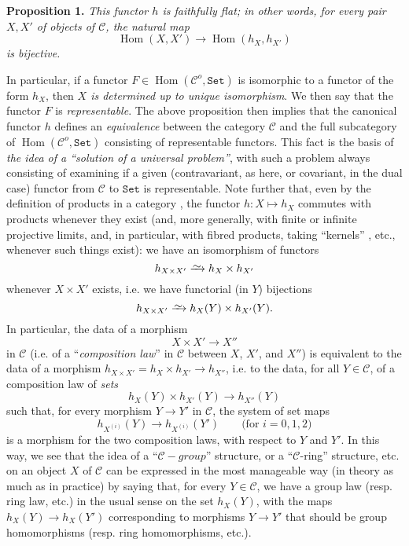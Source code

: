 \documentclass{article}
\newenvironment{itenv}[1]
  {\phantomsection\par\medskip\noindent\textbf{#1.}\itshape}
  {\medskip}
\renewcommand{\cal}[1]{{\mathcal{#1}}}
\newcommand{\simto}{\xrightarrow{\raisebox{-0.7ex}[0ex][0ex]{$\sim$}}}
\newcommand{\Set}{\mathtt{Set}}
\DeclareMathOperator{\Hom}{Hom}
\newcommand{\oldpage}[1]{\marginpar{\footnotesize$\Big\vert$ \textit{p.~#1}}}
\begin{document}
\begin{itenv}{Proposition 1}
\label{A.1-proposition1}
  This functor $h$ is \emph{faithfully flat};
  in other words, for every pair $X,X'$ of objects of $\cal{C}$, the natural map
  \[
    \Hom(X,X') \to \Hom(h_X,h_{X'})
  \]
  is \emph{bijective}.
\end{itenv}

In particular, if a functor $F\in\Hom(\cal{C}^o,\Set)$ is isomorphic to a functor of the form $h_X$, then \emph{$X$ is determined up to unique isomorphism}.
We then say that the functor $F$ is \emph{representable}.
The above proposition then implies that the canonical functor $h$ defines an \emph{equivalence} between the category $\cal{C}$ and the full subcategory of $\Hom(\cal{C}^o,\Set)$ consisting of representable functors.
This fact is the basis of \emph{the idea of a ``solution of a universal problem''}, with such a problem always consisting of examining if a given (contravariant, as here, or covariant, in the dual case) functor from $\cal{C}$ to $\Set$ is representable.
\oldpage{195-02}
Note further that, even by the definition of products in a category \cite{1}, the functor $h\colon X\mapsto h_X$ commutes with products whenever they exist (and, more generally, with finite or infinite projective limits, and, in particular, with fibred products, taking ``kernels'' \cite{2}, etc., whenever such things exist): we have an isomorphism of functors
\[
  h_{X\times X'} \simto h_X\times h_{X'}
\]
whenever $X\times X'$ exists, i.e. we have functorial (in $Y$) bijections
\[
  h_{X\times X'} \simto h_X(Y)\times h_{X'}(Y).
\]
In particular, the data of a morphism
\[
  X\times X' \to X''
\]
in $\cal{C}$ (i.e. of a ``\emph{composition law}'' in $\cal{C}$ between $X$, $X'$, and $X''$) is equivalent to the data of a morphism $h_{X\times X'}=h_X\times h_{X'}\to h_{X''}$, i.e. to the data, for all $Y\in\cal{C}$, of a composition law of \emph{sets}
\[
  h_X(Y)\times h_{X'}(Y) \to h_{X''}(Y)
\]
such that, for every morphism $Y\to Y'$ in $\cal{C}$, the system of set maps
\[
  h_{X^{(i)}}(Y) \to h_{X^{(i)}}(Y')
  \qquad\mbox{(for $i=0,1,2$)}
\]
is a morphism for the two composition laws, with respect to $Y$ and $Y'$.
In this way, we see that the idea of a ``$\cal{C}-group$'' structure, or a ``$\cal{C}$-ring'' structure, etc. on an object $X$ of $\cal{C}$ can be expressed in the most manageable way (in theory as much as in practice) by saying that, for every $Y\in\cal{C}$, we have a group law (resp. ring law, etc.) in the usual sense on the set $h_X(Y)$, with the maps $h_X(Y)\to h_X(Y')$ corresponding to morphisms $Y\to Y'$ that should be group homomorphisms (resp. ring homomorphisms, etc.).
\end{document}
